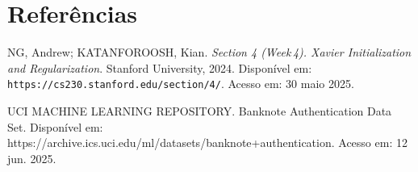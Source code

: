 \documentclass[12pt]{article}
\begin{document}
\newpage

\section*{Referências}

\begin{flushleft}

    NG, Andrew; KATANFOROOSH, Kian. \textit{Section 4 (Week 4). Xavier Initialization and Regularization}. Stanford University, 2024. Disponível em: \texttt{https://cs230.stanford.edu/section/4/}. Acesso em: 30 maio 2025.

    UCI MACHINE LEARNING REPOSITORY. Banknote Authentication Data Set. Disponível em: https://archive.ics.uci.edu/ml/datasets/banknote+authentication. Acesso em: 12 jun. 2025.

\end{flushleft}
\end{document}
